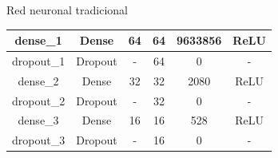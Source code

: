 \documentclass[10pt]{beamer}
\begin{document}
\begin{frame}{Red neuronal tradicional}
\begin{table}[]
{\begin{tabular}{@{}cccccc@{}}
        \multicolumn{1}{|c|}{dense\_1}      & \multicolumn{1}{c|}{Dense}         & \multicolumn{1}{c|}{64}                                                                    & \multicolumn{1}{c|}{64}                                                                        & \multicolumn{1}{c|}{9633856}                                                                    & \multicolumn{1}{c|}{ReLU}                                                                      \\ \midrule
        \multicolumn{1}{|c|}{dropout\_1}    & \multicolumn{1}{c|}{Dropout}       & \multicolumn{1}{c|}{-}                                                                     & \multicolumn{1}{c|}{64}                                                                        & \multicolumn{1}{c|}{0}                                                                          & \multicolumn{1}{c|}{-}                                                                         \\ \midrule
        \multicolumn{1}{|c|}{dense\_2}      & \multicolumn{1}{c|}{Dense}         & \multicolumn{1}{c|}{32}                                                                    & \multicolumn{1}{c|}{32}                                                                        & \multicolumn{1}{c|}{2080}                                                                       & \multicolumn{1}{c|}{ReLU}                                                                      \\ \midrule
        \multicolumn{1}{|c|}{dropout\_2}    & \multicolumn{1}{c|}{Dropout}       & \multicolumn{1}{c|}{-}                                                                     & \multicolumn{1}{c|}{32}                                                                        & \multicolumn{1}{c|}{0}                                                                          & \multicolumn{1}{c|}{-}                                                                         \\ \midrule
        \multicolumn{1}{|c|}{dense\_3}      & \multicolumn{1}{c|}{Dense}         & \multicolumn{1}{c|}{16}                                                                    & \multicolumn{1}{c|}{16}                                                                        & \multicolumn{1}{c|}{528}                                                                        & \multicolumn{1}{c|}{ReLU}                                                                      \\ \midrule
        \multicolumn{1}{|c|}{dropout\_3}    & \multicolumn{1}{c|}{Dropout}       & \multicolumn{1}{c|}{-}                                                                     & \multicolumn{1}{c|}{16}                                                                        & \multicolumn{1}{c|}{0}                                                                          & \multicolumn{1}{c|}{-}                                                                         \\ \midrule

\end{tabular}}
\end{table}
\end{frame}
\end{document}
